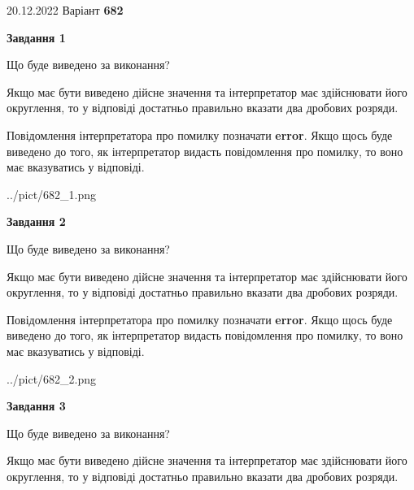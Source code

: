 \documentclass[12pt, ukrainian]{article}
\begin{document}
{20.12.2022 Варіант \No \textbf { 682 }\par}
{
\begin {Large}

{\begin {center}\textbf{Завдання 1}\end {center}}\par
Що буде виведено за виконання? \par

Якщо має бути виведено дійсне значення та інтерпретатор має здійснювати його округлення, 
то у відповіді достатньо правильно вказати два дробових розряди.

Повідомлення інтерпретатора про помилку позначати \textbf{error}.
Якщо щось буде виведено до того, як інтерпретатор видасть повідомлення про помилку, 
то воно має вказуватись у відповіді. \par

\begin{center}
	{../pict/682_1.png}
\end{center}
\newpage

{\begin {center}\textbf{Завдання 2}\end {center}}\par
Що буде виведено за виконання? \par

Якщо має бути виведено дійсне значення та інтерпретатор має здійснювати його округлення, 
то у відповіді достатньо правильно вказати два дробових розряди.

Повідомлення інтерпретатора про помилку позначати \textbf{error}.
Якщо щось буде виведено до того, як інтерпретатор видасть повідомлення про помилку, 
то воно має вказуватись у відповіді. \par

\begin{center}
	{../pict/682_2.png}
\end{center}
\newpage

{\begin {center}\textbf{Завдання 3}\end {center}}\par
Що буде виведено за виконання? \par

Якщо має бути виведено дійсне значення та інтерпретатор має здійснювати його округлення, 
то у відповіді достатньо правильно вказати два дробових розряди.


\end{Large}}
\end{document}
